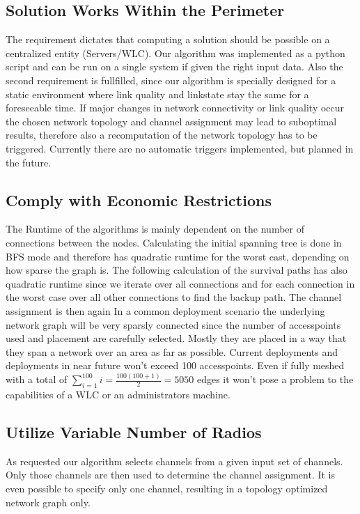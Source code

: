   \subsection{Solution Works Within the Perimeter}
    The requirement dictates that computing a solution should be possible on a centralized entity (Servers/WLC).
    Our algorithm was implemented as a python script and can be run on a single system if given the right input data.
    Also the second requirement is fullfilled, since our algorithm is specially designed for a static environment where link quality and linkstate stay the same
    for a foreseeable time. If major changes in network connectivity or link quality occur the chosen network topology and channel assignment
    may lead to suboptimal results, therefore also a recomputation of the network topology has to be triggered.
    Currently there are no automatic triggers implemented, but planned in the future.
  \subsection{Comply with Economic Restrictions}
    The Runtime of the algorithms is mainly dependent on the number of connections between the nodes. Calculating the initial spanning tree is done in BFS mode and 
    therefore has quadratic runtime for the worst cast, depending on how sparse the graph is. The following calculation of the survival paths has also quadratic runtime 
    since we iterate over all connections and for each connection in the worst case over all other connections to find the backup path. The channel assignment is then again
    In a common deployment scenario the underlying network graph will be very sparsly connected since the number of accesspoints used and placement are carefully selected.
    Mostly they are placed in a way that they span a network over an area as far as possible.
    Current deployments and deployments in near future won't exceed 100 accesspoints. Even if fully meshed with a total of \(\sum \limits_{i=1}^{100} i = \frac{100(100+1)}{2}=5050\)
    edges it won't pose a problem to the capabilities of a WLC or an administrators machine.
  \subsection{Utilize Variable Number of Radios}
    As requested our algorithm selects channels from a given input set of channels. Only those channels are then used to determine the channel assignment.
    It is even possible to specify only one channel, resulting in a topology optimized network graph only.
